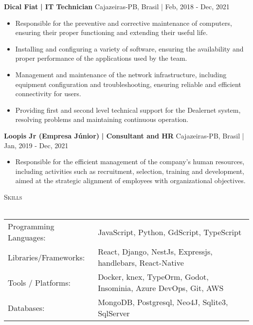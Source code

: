 \documentclass[a4paper]{article}
\newcommand{\lineunder} {
    \vspace*{-8pt} \\
    \hspace*{-18pt} \hrulefill \\
}
\newcommand{\header} [1] {
    {\hspace*{-18pt}\vspace*{6pt} \textsc{#1}}
    \vspace*{-6pt} \lineunder
}
\begin{document}
\textbf{Dical Fiat}\textbf{ | IT Technician} \hfill Cajazeiras-PB, Brasil | Feb, 2018 - Dec, 2021\\
\vspace{-3mm}
\begin{itemize} \itemsep -3pt
    \item  Responsible for the preventive and corrective maintenance of computers, ensuring their proper functioning and extending their useful life.
    \item  Installing and configuring a variety of software, ensuring the availability and proper performance of the applications used by the team.
    \item  Management and maintenance of the network infrastructure, including equipment configuration and troubleshooting, ensuring reliable and efficient connectivity for users.
    \item  Providing first and second level technical support for the Dealernet system, resolving problems and maintaining continuous operation.
\end{itemize}
\textbf{Loopis Jr (Empresa Júnior)}\textbf{ | Consultant and HR} \hfill Cajazeiras-PB, Brasil | Jan, 2019 - Dec, 2021\\
\vspace{-3mm}
\begin{itemize} \itemsep -3pt
    \item  Responsible for the efficient management of the company's human resources, including activities such as recruitment, selection, training and development, aimed at the strategic alignment of employees with organizational objectives.

\end{itemize}

%
%
\header{Skills}
\vspace{2mm}
\begin{longtable}{p{4cm}p{12cm}}
    Programming Languages: & JavaScript, Python, GdScript, TypeScript                        \\
    Libraries/Frameworks:  & React, Django, NestJs, Expressjs, handlebars, React-Native      \\
    Tools / Platforms:     & Docker, knex, TypeOrm, Godot, Insominia, Azure DevOps, Git, AWS \\
    Databases:             & MongoDB, Postgresql, Neo4J, Sqlite3, SqlServer                  \\
\end{longtable}
\vspace{1mm}
\end{document}
